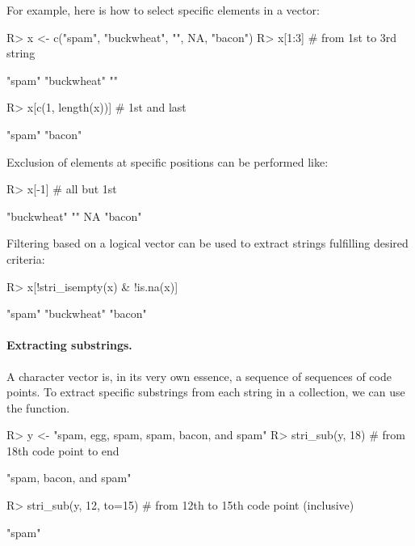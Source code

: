 \documentclass[nojss]{jss}
\begin{document}
For example, here is how to select specific elements in a vector:

\begin{Schunk}
\begin{Sinput}
R> x <- c("spam", "buckwheat", "", NA, "bacon")
R> x[1:3]                           # from 1st to 3rd string
\end{Sinput}
\begin{Soutput}
[1] "spam"      "buckwheat" ""
\end{Soutput}
\begin{Sinput}
R> x[c(1, length(x))]               # 1st and last
\end{Sinput}
\begin{Soutput}
[1] "spam"  "bacon"
\end{Soutput}
\end{Schunk}

\noindent
Exclusion of elements at specific positions can be performed like:

\begin{Schunk}
\begin{Sinput}
R> x[-1]                            # all but 1st
\end{Sinput}
\begin{Soutput}
[1] "buckwheat" ""          NA          "bacon"
\end{Soutput}
\end{Schunk}

\noindent
Filtering based on a logical vector can be used to extract
strings fulfilling desired criteria:

\begin{Schunk}
\begin{Sinput}
R> x[!stri_isempty(x) & !is.na(x)]
\end{Sinput}
\begin{Soutput}
[1] "spam"      "buckwheat" "bacon"
\end{Soutput}
\end{Schunk}


\paragraph{Extracting substrings.}
A character vector is, in its very own essence, a sequence of
sequences of code points.
To extract specific substrings from each string in a collection,
we can use the  function.

\begin{Schunk}
\begin{Sinput}
R> y <- "spam, egg, spam, spam, bacon, and spam"
R> stri_sub(y, 18)             # from 18th code point to end
\end{Sinput}
\begin{Soutput}
[1] "spam, bacon, and spam"
\end{Soutput}
\begin{Sinput}
R> stri_sub(y, 12, to=15)      # from 12th to 15th code point (inclusive)
\end{Sinput}
\begin{Soutput}
[1] "spam"
\end{Soutput}
\end{Schunk}
\end{document}
